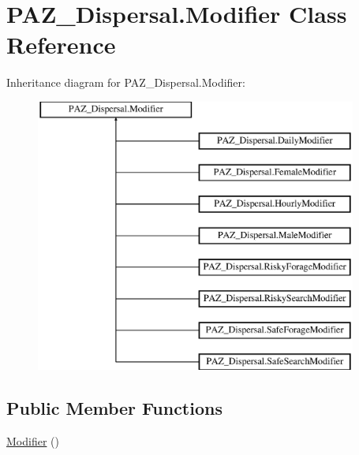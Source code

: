 \hypertarget{class_p_a_z___dispersal_1_1_modifier}{\section{P\-A\-Z\-\_\-\-Dispersal.\-Modifier Class Reference}
\label{class_p_a_z___dispersal_1_1_modifier}
}
Inheritance diagram for P\-A\-Z\-\_\-\-Dispersal.\-Modifier\-:\begin{figure}[H]
\begin{center}
\leavevmode
\includegraphics[height=9.000000cm]{class_p_a_z___dispersal_1_1_modifier}
\end{center}
\end{figure}
\subsection*{Public Member Functions}
\begin{DoxyCompactItemize}
\item 
\hyperlink{class_p_a_z___dispersal_1_1_modifier_ae79e89badf4c35fe38d46caa9de9d03e}{Modifier} ()
\end{DoxyCompactItemize}
